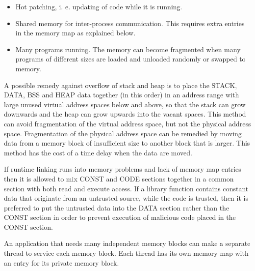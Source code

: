 \documentclass[forwardcom.tex]{subfiles}
\begin{document}
\begin{itemize}
\item Hot patching, i. e. updating of code while it is running. 

\item Shared memory for inter-process communication. This requires extra entries in the memory map as explained below.

\item Many programs running. The memory can become fragmented when many programs of different sizes are loaded and unloaded randomly or swapped to memory. 
\end{itemize}

A possible remedy against overflow of stack and heap is to place the STACK, DATA, BSS and HEAP data together (in this order) in an address range with large unused virtual address spaces below and above, so that the stack can grow downwards and the heap can grow upwards into the vacant spaces. This method can avoid fragmentation of the virtual address space, but not the physical address space. Fragmentation of the physical address space can be remedied by moving data from a memory block of insufficient size to another block that is larger. This method has the cost of a time delay when the data are moved. 
\vspace{2mm}

If runtime linking runs into memory problems and lack of memory map entries then it is allowed to mix CONST and CODE sections together in a common section with both read and execute access. If a library function contains constant data that originate from an untrusted source, while the code is trusted, then it is preferred to put the untrusted data into the DATA section rather than the CONST section in order to prevent execution of malicious code placed in the CONST section.
\vspace{2mm}

An application that needs many independent memory blocks can make a separate thread to service each memory block. Each thread has its own memory map with an entry for its private memory block.
\vspace{2mm}
\end{document}
